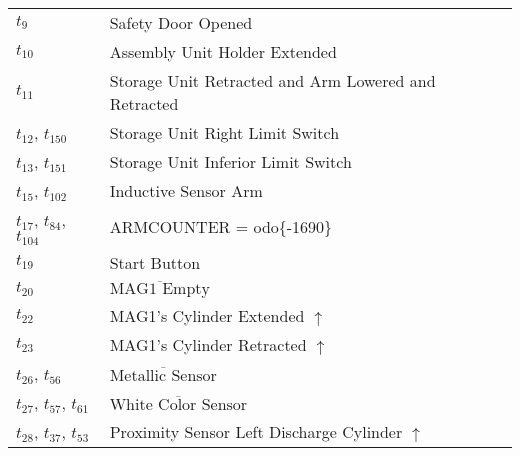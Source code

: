 \begin{longtable}{m{5cm}m{5cm}}
\hyperlink{completeNet:t9}{\hypertarget{completeTable:t9}{$t_{9}$}} & Safety Door Opened\\
\hyperlink{completeNet:t10}{\hypertarget{completeTable:t10}{$t_{10}$}} & Assembly Unit Holder Extended\\
\hyperlink{completeNet:t11}{\hypertarget{completeTable:t11}{$t_{11}$}} & Storage Unit Retracted and Arm Lowered and Retracted\\
\hyperlink{completeNet:t12}{\hypertarget{completeTable:t12}{$t_{12}$}}, \hyperlink{completeNet:t150}{\hypertarget{completeTable:t150}{$t_{150}$}} & Storage Unit Right Limit Switch\\
\hyperlink{completeNet:t13}{\hypertarget{completeTable:t13}{$t_{13}$}}, \hyperlink{completeNet:t151}{\hypertarget{completeTable:t151}{$t_{151}$}} & Storage Unit Inferior Limit Switch\\
\hyperlink{completeNet:t15}{\hypertarget{completeTable:t15}{$t_{15}$}}, \hyperlink{completeNet:t102}{\hypertarget{completeTable:t102}{$t_{102}$}} & Inductive Sensor Arm\\
\hyperlink{completeNet:t17}{\hypertarget{completeTable:t17}{$t_{17}$}}, \hyperlink{completeNet:t84}{\hypertarget{completeTable:t84}{$t_{84}$}}, \hyperlink{completeNet:t104}{\hypertarget{completeTable:t104}{$t_{104}$}} & ARMCOUNTER = 	odo\{-1690\}\\
\hyperlink{completeNet:t19}{\hypertarget{completeTable:t19}{$t_{19}$}} & Start Button\\
\hyperlink{completeNet:t20}{\hypertarget{completeTable:t20}{$t_{20}$}} & \(\overline{\mbox{MAG1 Empty}}\)\\
\hyperlink{completeNet:t22}{\hypertarget{completeTable:t22}{$t_{22}$}} & MAG1's Cylinder Extended \(\uparrow\)\\
\hyperlink{completeNet:t23}{\hypertarget{completeTable:t23}{$t_{23}$}} & MAG1's Cylinder Retracted \(\uparrow\)\\
\hyperlink{completeNet:t26}{\hypertarget{completeTable:t26}{$t_{26}$}}, \hyperlink{completeNet:t56}{\hypertarget{completeTable:t56}{$t_{56}$}} & \(\overline{\mbox{Metallic Sensor}}\)\\
\hyperlink{completeNet:t27}{\hypertarget{completeTable:t27}{$t_{27}$}}, \hyperlink{completeNet:t57}{\hypertarget{completeTable:t57}{$t_{57}$}}, \hyperlink{completeNet:t61}{\hypertarget{completeTable:t61}{$t_{61}$}} & \(\overline{\mbox{White Color Sensor}}\)\\
\hyperlink{completeNet:t28}{\hypertarget{completeTable:t28}{$t_{28}$}}, \hyperlink{completeNet:t37}{\hypertarget{completeTable:t37}{$t_{37}$}}, \hyperlink{completeNet:t53}{\hypertarget{completeTable:t53}{$t_{53}$}} & Proximity Sensor Left Discharge Cylinder \(\uparrow\)\\

\end{longtable}

